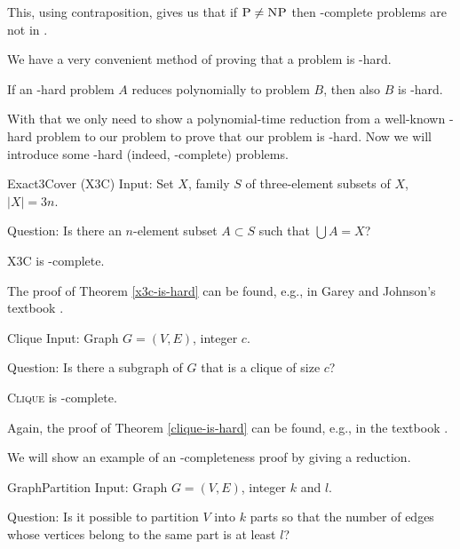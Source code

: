 This, using contraposition, gives us that if $\text{\textsc{P}} \neq \text{\textsc{NP}}$ then \np-complete problems are not in \p.

We have a very convenient method of proving that a problem is \np-hard.

\begin{rmrk}
If an \np-hard problem $A$ reduces polynomially to problem $B$, then also $B$ is \np-hard.
\end{rmrk}

With that we only need to show a polynomial-time reduction from a well-known \np-hard problem
to our problem to prove that our problem is \np-hard.
Now we will introduce some \np-hard (indeed, \np-complete) problems.

\begin{problem}{Exact3Cover (X3C)}
	Input: Set $X$, family $S$ of three-element subsets of $X$, $\vert{X}\vert = 3n$.

	Question: Is there an $n$-element subset $A \subset S$ such that $\bigcup A = X$?
\end{problem}

\begin{thm} \label{x3s-is-hard}
\textsc{X3C} is \np-complete.
\end{thm}

The proof of Theorem \ref{x3c-is-hard} can be found, e.g., in
Garey and Johnson's textbook \cite{computersandintractability}.

\begin{problem}{Clique}
    Input: Graph $G = (V, E)$, integer $c$.

    Question: Is there a subgraph of $G$ that is a clique of size $c$?
\end{problem}

\begin{thm} \label{clique-is-hard}
\textsc{Clique} is \np-complete.
\end{thm}

Again, the proof of Theorem \ref{clique-is-hard} can be found, e.g.,
in the textbook \cite{computersandintractability}.


We will show an example of an \np-completeness proof by giving a reduction.

\begin{problem}{GraphPartition}
Input: Graph $G = (V, E)$, integer $k$ and $l$.

Question: Is it possible to partition $V$ into $k$ parts so that the number of edges
whose vertices belong to the same part is at least $l$?
\end{problem}

